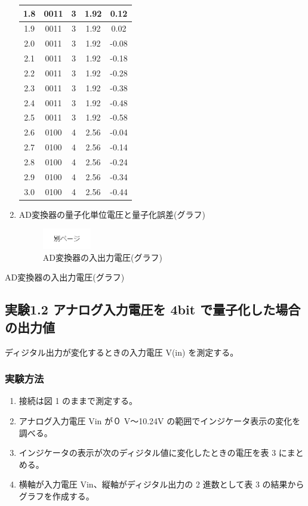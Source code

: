 \documentclass[10pt]{article}
\begin{document}
\begin{enumerate}
\begin{table}[H]
\begin{tabular}{|*{5}{c|}}
            1.8 & 0011 & 3 & 1.92 & 0.12  \\ \hline
            1.9 & 0011 & 3 & 1.92 & 0.02  \\ \hline
            2.0 & 0011 & 3 & 1.92 & -0.08 \\ \hline
            2.1 & 0011 & 3 & 1.92 & -0.18 \\ \hline
            2.2 & 0011 & 3 & 1.92 & -0.28 \\ \hline
            2.3 & 0011 & 3 & 1.92 & -0.38 \\ \hline
            2.4 & 0011 & 3 & 1.92 & -0.48 \\ \hline
            2.5 & 0011 & 3 & 1.92 & -0.58 \\ \hline
            2.6 & 0100 & 4 & 2.56 & -0.04 \\ \hline
            2.7 & 0100 & 4 & 2.56 & -0.14 \\ \hline
            2.8 & 0100 & 4 & 2.56 & -0.24 \\ \hline
            2.9 & 0100 & 4 & 2.56 & -0.34 \\ \hline
            3.0 & 0100 & 4 & 2.56 & -0.44 \\ \hline
\end{tabular}
\end{table} 
\endgroup
\pagebreak

\item AD変換器の量子化単位電圧と量子化誤差(グラフ)
	\begin{figure}[H]
		\centering
		\includegraphics[width=0.2\textwidth]{page.png}
		\caption{AD変換器の入出力電圧(グラフ)}
	\end{figure}
\end{enumerate}
\pagebreak

AD変換器の入出力電圧(グラフ)
\pagebreak

\subsection{実験1.2 アナログ入力電圧を 4bit で量子化した場合の出力値}
ディジタル出力が変化するときの入力電圧 V(in) を測定する。

\subsubsection{実験方法}

\begin{enumerate}
 \item 接続は図 1 のままで測定する。
 \item アナログ入力電圧 Vin が０ V～10.24V の範囲でインジケータ表示の変化を調べる。
 \item インジケータの表示が次のディジタル値に変化したときの電圧を表 3 にまとめる。
 \item 横軸が入力電圧 Vin、縦軸がディジタル出力の 2 進数として表 3 の結果からグラフを作成する。
\end{enumerate}
\end{document}
